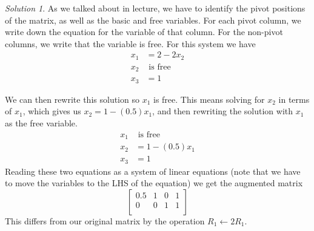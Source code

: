 \documentclass{article}
\theoremstyle{remark}
\newtheorem*{solution}{Solution}
\begin{document}
\begin{solution}
  As we talked about in lecture, we have to identify the pivot positions of the matrix, as well as the basic and free variables.
  For each pivot column, we write down the equation for the variable of that column.
  For the non-pivot columns, we write that the variable is free.
  For this system we have
  \begin{align*}
    x_1 &= 2 - 2x_2 \\
    x_2 &\text{ is free} \\
    x_3 &= 1
  \end{align*}

  We can then rewrite this solution so $x_1$ is free.
  This means solving for $x_2$ in terms of $x_1$, which gives us $x_2 = 1 - (0.5)x_1$, and then rewriting the solution with $x_1$ as the free variable.
  \begin{align*}
    x_1 &\text{ is free} \\
    x_2 &= 1 - (0.5)x_1 \\
    x_3 &= 1
  \end{align*}
  Reading these two equations as a system of linear equations (note that we have to move the variables to the LHS of the equation) we get the augmented matrix
  \begin{displaymath}
    \begin{bmatrix}
      0.5 & 1 & 0 & 1 \\
      0 & 0 & 1 & 1 \\
    \end{bmatrix}
  \end{displaymath}
  This differs from our original matrix by the operation $R_1 \gets 2R_1$.
\end{solution}
\end{document}
